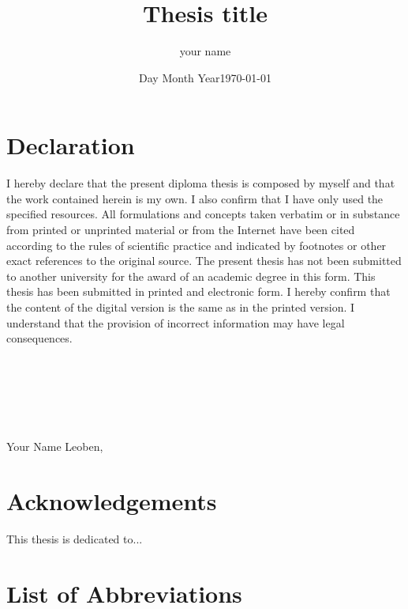 \documentclass[11pt,twoside]{report}
\title{Thesis title}
\author{your name}
\date{Day Month Year}
\begin{document}
	
	
	\newpage\null\thispagestyle{empty}\newpage
	

	

	
	\chapter*{Declaration}%
	I hereby declare that the present diploma thesis is composed
	by myself and that the work contained herein is my own. I also confirm that I have only used the specified resources. All formulations and concepts taken verbatim or in substance from printed
	or unprinted material or from the Internet have been cited according to the rules of scientific practice and indicated by footnotes or other exact references to the original source. The present thesis has not been submitted to another university for the award of an academic
	degree in this form. This thesis has been submitted in printed and electronic form. I hereby confirm that the content of the digital version is the same as in the printed version. I understand that the provision of incorrect information may have legal consequences. \\ 
	\\ \\
	\\ \\
    \\\\
	Your Name \space\space\space\space\space\space\space\space\space\space\space\space\space\space\space\space\space\space\space\space\space\space\space\space\space\space\space\space\space\space\space\space\space\space\space\space\space\space\space\space\space Leoben, \date{\today}
	
	\newpage\null\thispagestyle{empty}\newpage
	
	
	
	
	
	\chapter*{Acknowledgements}
	This thesis is dedicated to...
	
	\tableofcontents
	
	\chapter*{List of Abbreviations}
	
\end{document}
